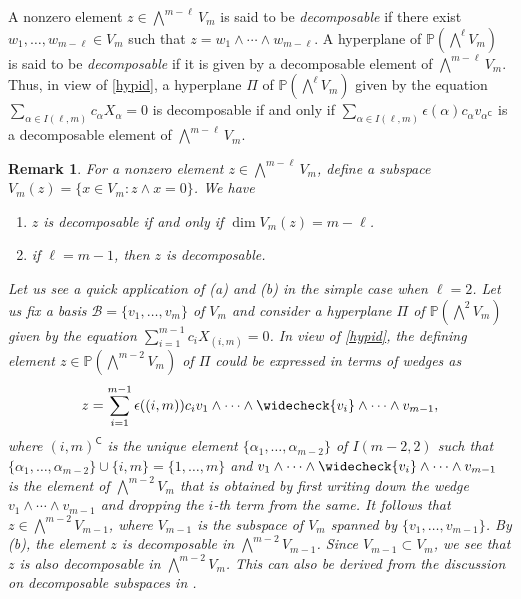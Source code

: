 \documentclass[10pt,a4paper,oneside]{amsproc}
\newtheorem{remark}[theorem]{Remark}
\newcommand{\B}{\mathcal{B}}
\def\a{{\alpha}}
\def\PP{{\mathbb P}}
\begin{document}
A nonzero element $z \in \bigwedge^{m- \ell} V_m$ is said to be \emph{decomposable} if there exist $w_1, \dots, w_{m-\ell} \in V_m$ such that $z = w_1 \wedge \cdots \wedge w_{m-\ell}$. A hyperplane of $\PP\left(\bigwedge^\ell V_m\right)$ is said to be \emph{decomposable} if it is given by a decomposable element of $\bigwedge^{m- \ell} V_m$. Thus, in view of \eqref{hypid}, a hyperplane $\Pi$ of $\displaystyle{\PP\left(\bigwedge^{\ell} V_m\right)}$ given by the equation $\displaystyle{\sum_{\a \in I(\ell, m)}} c_\a X_\a = 0$ is decomposable if and only if $\displaystyle{\sum_{\a \in I(\ell, m)} \epsilon (\a) c_\a v_{\a^{\mathsf{C}}}}$ is a decomposable element of $\bigwedge^{m - \ell} V_m$.  

\begin{remark}\label{rem1:dec}\normalfont
    For a nonzero element $z \in \bigwedge^{m - \ell} V_m$, define a subspace $V_m (z) = \{x \in V_m : z \wedge x = 0\}$. We have
    \begin{enumerate}
        \item[(a)] \cite[Section 4.1, Theorem 1.1]{M}  $z$ is decomposable if and only if $\dim V_m (z) = m - \ell$. 
        \item[(b)] \cite[Section 4.1, Theorem 1.3]{M} if $\ell = m-1$, then $z$ is decomposable. 
    \end{enumerate}
    Let us see a quick application of (a) and (b) in the simple case when $\ell = 2$. Let us fix a basis $\B = \{v_1, \dots, v_m\}$ of $V_m$ and consider a hyperplane $\Pi$ of $\PP\left(\bigwedge^2 V_m\right)$ given by the equation $\displaystyle{\sum_{i=1}^{m-1}} {c_i} X_{(i,m)} = 0$. In view of \eqref{hypid}, the defining element $z \in \PP \left( \bigwedge^{m- 2} V_m \right)$ of $\Pi$ could be expressed in terms of wedges as 
    $$z= \sum_{i=1}^{m-1} \epsilon ((i, m)) c_i v_1 \wedge \dots \wedge \widecheck{v_i} \wedge \dots \wedge v_{m-1},$$
    where $(i, m)^{\mathsf{C}}$ is the unique element $\{\a_1, \dots, \a_{m-2}\}$ of $I (m - 2, 2)$ such that $\{\a_1, \dots, \a_{m-2}\} \cup \{i, m\} = \{1, \dots, m\}$ and  $v_1 \wedge \dots \wedge \widecheck{v_i} \wedge \dots \wedge v_{m-1}$ is the element of $\bigwedge^{m-2} V_m$ that is obtained by first writing down the wedge $v_1 \wedge \cdots \wedge v_{m-1}$ and dropping the $i$-th term from the same. 
    It follows that $z \in \bigwedge^{m- 2} V_{m-1}$, where $V_{m-1}$ is the subspace of $V_m$ spanned by $\{v_1, \dots, v_{m-1}\}$. By (b), the element $z$ is decomposable in $\bigwedge^{m- 2} V_{m-1}$. Since $V_{m-1} \subset V_m$, we see that $z$ is also decomposable in $\bigwedge^{m- 2} V_{m}$. This can also be derived from the discussion on decomposable subspaces in \cite[Section 2]{GPP}. 
\end{remark}
\end{document}
